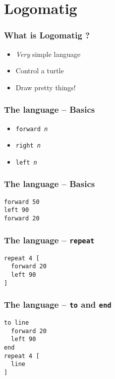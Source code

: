 \section{Logomatig}
\begin{frame}
\frametitle{What is Logomatig ?}
  \begin{itemize}
    \item \emph{Very} simple language
    \item Control a turtle
    \item Draw pretty things!
  \end{itemize}
\end{frame}

\begin{frame}
\frametitle{The language -- Basics}
  \begin{itemize}
    \item \texttt{forward \emph{n}}
    \item \texttt{right \emph{n}}
    \item \texttt{left \emph{n}}
  \end{itemize}
\end{frame}

\begin{frame}[fragile]
\frametitle{The language -- Basics}
\begin{verbatim}
forward 50
left 90
forward 20
\end{verbatim}

\begin{center}
\end{center}
\end{frame}

\begin{frame}[fragile]
  \frametitle{The language -- \texttt{repeat}}
\begin{verbatim}
repeat 4 [
  forward 20
  left 90
]
\end{verbatim}

\begin{center}
\end{center}
\end{frame}

\begin{frame}[fragile]
  \frametitle{The language -- \texttt{to} and \texttt{end}}
\begin{verbatim}
to line
  forward 20
  left 90
end
repeat 4 [
  line
]
\end{verbatim}

\begin{center}
\end{center}
\end{frame}

